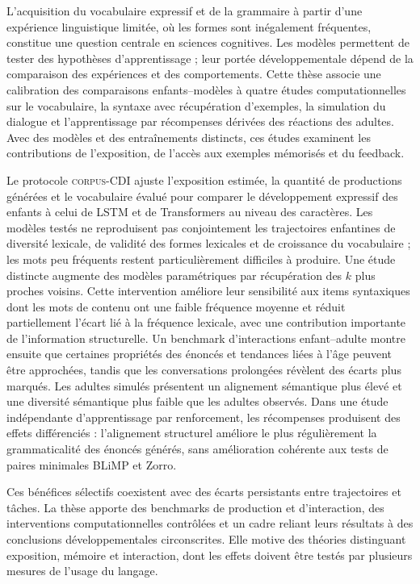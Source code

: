 L'acquisition du vocabulaire expressif et de la grammaire à partir d'une expérience linguistique limitée, où les formes sont inégalement fréquentes, constitue une question centrale en sciences cognitives. Les modèles permettent de tester des hypothèses d'apprentissage ; leur portée développementale dépend de la comparaison des expériences et des comportements. Cette thèse associe une calibration des comparaisons enfants--modèles à quatre études computationnelles sur le vocabulaire, la syntaxe avec récupération d'exemples, la simulation du dialogue et l'apprentissage par récompenses dérivées des réactions des adultes. Avec des modèles et des entraînements distincts, ces études examinent les contributions de l'exposition, de l'accès aux exemples mémorisés et du feedback.

Le protocole \textsc{corpus-CDI} ajuste l'exposition estimée, la quantité de productions générées et le vocabulaire évalué pour comparer le développement expressif des enfants à celui de LSTM et de Transformers au niveau des caractères. Les modèles testés ne reproduisent pas conjointement les trajectoires enfantines de diversité lexicale, de validité des formes lexicales et de croissance du vocabulaire ; les mots peu fréquents restent particulièrement difficiles à produire. Une étude distincte augmente des modèles paramétriques par récupération des $k$ plus proches voisins. Cette intervention améliore leur sensibilité aux items syntaxiques dont les mots de contenu ont une faible fréquence moyenne et réduit partiellement l'écart lié à la fréquence lexicale, avec une contribution importante de l'information structurelle. Un benchmark d'interactions enfant--adulte montre ensuite que certaines propriétés des énoncés et tendances liées à l'âge peuvent être approchées, tandis que les conversations prolongées révèlent des écarts plus marqués. Les adultes simulés présentent un alignement sémantique plus élevé et une diversité sémantique plus faible que les adultes observés. Dans une étude indépendante d'apprentissage par renforcement, les récompenses produisent des effets différenciés : l'alignement structurel améliore le plus régulièrement la grammaticalité des énoncés générés, sans amélioration cohérente aux tests de paires minimales BLiMP et Zorro.

Ces bénéfices sélectifs coexistent avec des écarts persistants entre trajectoires et tâches. La thèse apporte des benchmarks de production et d'interaction, des interventions computationnelles contrôlées et un cadre reliant leurs résultats à des conclusions développementales circonscrites. Elle motive des théories distinguant exposition, mémoire et interaction, dont les effets doivent être testés par plusieurs mesures de l'usage du langage.
